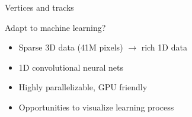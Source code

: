 \begin{frame}{Vertices and tracks}
  \begin{block}{Adapt to machine learning?}
  \begin{itemize}
      \item Sparse 3D data (41M pixels) $\to$ rich 1D data
      \item 1D convolutional neural nets
      \item Highly parallelizable, GPU friendly
      \item Opportunities to visualize learning process
  \end{itemize}
  \end{block}
\end{frame}

